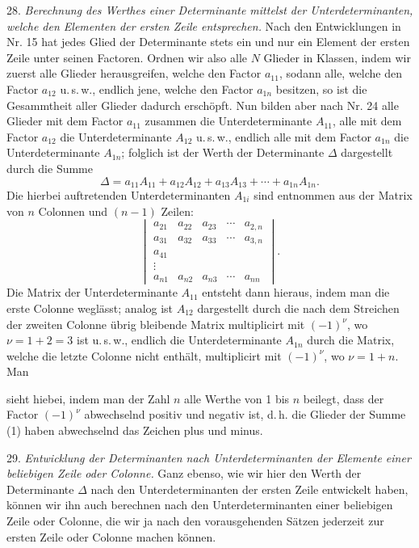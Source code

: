 \documentclass[11pt]{article}
\providecommand{\weberpage}[1]{}
\providecommand{\weq}[2]{\begin{equation}\tag{#1}#2\end{equation}}
\let\Delta\varDelta
\begin{document}
28. \textit{Berechnung des Werthes einer Determinante mittelst der
Unterdeterminanten, welche den Elementen der ersten Zeile entsprechen.}
Nach den Entwicklungen in Nr. 15 hat jedes Glied der Determinante stets ein
und nur ein Element der ersten Zeile unter seinen Factoren. Ordnen wir also
alle $N$ Glieder in Klassen, indem wir zuerst alle Glieder herausgreifen,
welche den Factor $a_{11}$, sodann alle, welche den Factor $a_{12}$
u.\,s.\,w., endlich jene, welche den Factor $a_{1n}$ besitzen, so ist die
Gesammtheit aller Glieder dadurch erschöpft. Nun bilden aber nach Nr. 24
alle Glieder mit dem Factor $a_{11}$ zusammen die Unterdeterminante $A_{11}$,
alle mit dem Factor $a_{12}$ die Unterdeterminante $A_{12}$ u.\,s.\,w.,
endlich alle mit dem Factor $a_{1n}$ die Unterdeterminante $A_{1n}$; folglich
ist der Werth der Determinante $\Delta$ dargestellt durch die Summe
\weq{1}{\Delta = a_{11}A_{11}+a_{12}A_{12}+a_{13}A_{13}+\cdots+a_{1n}A_{1n}.}
Die hierbei auftretenden Unterdeterminanten $A_{1i}$ sind entnommen aus der
Matrix von $n$ Colonnen und $(n-1)$ Zeilen:
\weq{A}{
\begin{vmatrix}
a_{21} & a_{22} & a_{23} & \cdots & a_{2,n} \\
a_{31} & a_{32} & a_{33} & \cdots & a_{3,n} \\
a_{41} & & & & \\
\vdots & & & & \\
a_{n1} & a_{n2} & a_{n3} & \cdots & a_{nn}
\end{vmatrix}.
}
Die Matrix der Unterdeterminante $A_{11}$ entsteht dann hieraus, indem man
die erste Colonne weglässt; analog ist $A_{12}$ dargestellt durch die nach
dem Streichen der zweiten Colonne übrig bleibende Matrix multiplicirt mit
$(-1)^\nu$, wo $\nu=1+2=3$ ist u.\,s.\,w., endlich die Unterdeterminante
$A_{1n}$ durch die Matrix, welche die letzte Colonne nicht enthält,
multiplicirt mit $(-1)^\nu$, wo $\nu=1+n$. Man


\weberpage{35}
sieht hiebei, indem man der Zahl $n$ alle Werthe von 1 bis $n$ beilegt, dass
der Factor $(-1)^\nu$ abwechselnd positiv und negativ ist, d.\,h. die
Glieder der Summe (1) haben abwechselnd das Zeichen plus und minus.

29. \textit{Entwicklung der Determinanten nach Unterdeterminanten der
Elemente einer beliebigen Zeile oder Colonne.} Ganz ebenso, wie wir hier den
Werth der Determinante $\Delta$ nach den Unterdeterminanten der ersten
Zeile entwickelt haben, können wir ihn auch berechnen nach den
Unterdeterminanten einer beliebigen Zeile oder Colonne, die wir ja nach den
vorausgehenden Sätzen jederzeit zur ersten Zeile oder Colonne machen können.
\end{document}
